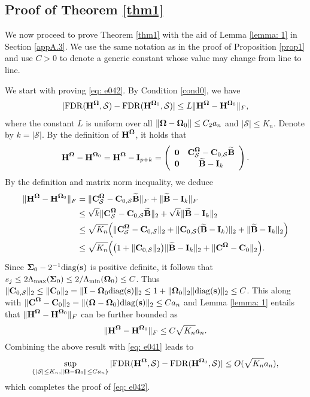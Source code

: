 \documentclass[11pt]{article}
\newcommand{\bs}{\mbox{\bf s}}
\newcommand{\bB}{\mbox{\bf B}}
\newcommand{\bC}{\mbox{\bf C}}
\newcommand{\bH}{\mbox{\bf H}}
\newcommand{\bI}{\mbox{\bf I}}
\newcommand{\bzero}{\mbox{\bf 0}}
\newcommand{\bSig}{\mbox{\boldmath $\Sigma$}}
\newcommand{\bOmg}{\mbox{\boldmath $\Omega$}}
\newcommand{\wt}{\widetilde}
\newcommand{\sbOmg}{\mbox{\scriptsize\boldmath $\Omega$}}
\newcommand{\Sig}{\mathbf{\Sigma}}
\newcommand{\diag}{\mathrm{diag}}
\begin{document}
\subsection{Proof of Theorem \ref{thm1}} \label{appA.4}

We now proceed to prove Theorem \ref{thm1} with the aid of Lemma \ref{lemma: 1} in Section \ref{appA.3}. We use the same notation  as in the proof of Proposition \ref{prop1} and use $C>0$ to denote a generic constant whose value may change from line to line.

We start with proving \eqref{eq: e042}. By Condition \ref{cond0}, we have
\begin{align}\label{eq: e041}
|{\rm FDR}(\bH^{\sbOmg}, \mathcal{S}) - {\rm FDR}(\bH^{\sbOmg_0}, \mathcal{S})| \leq L\|\bH^{\sbOmg} - \bH^{\sbOmg_0}\|_F,
\end{align}
where the constant $L$ is uniform over all $\|\bOmg - \bOmg_{0}\|\leq C_2a_n$ and $|\mathcal{S}|\leq K_n$.  Denote by $k = |\mathcal{S}|$. By the definition of $\bH^{\sbOmg}$, it holds that
\begin{align*}
\bH^{\sbOmg} - \bH^{\sbOmg_0} = \bH^{\sbOmg} - \bI_{p+k} = \left(\begin{array}{cc}
\bzero & \bC_{\mathcal S}^{\sbOmg}- \bC_{0,\mathcal{S}}\wt{\bB} \\
\bzero & \wt{\bB} -\bI_k
\end{array}\right).
\end{align*}
By the definition and matrix norm inequality, we deduce
\begin{align*}
\|\bH^{\sbOmg} - \bH^{\sbOmg_0} \|_F  & = \|\bC_{\mathcal S}^{\sbOmg}- \bC_{0,\mathcal{S}}\wt{\bB} \|_F + \|\wt{\bB} - \bI_k\|_F\\
&\leq  \sqrt{k}\|\bC_{\mathcal S}^{\sbOmg}- \bC_{0,\mathcal{S}}\wt{\bB} \|_2 + \sqrt{k} \|\wt{\bB} - \bI_k\|_2 \\
&\leq \sqrt{K_n}\Big(\|\bC_{\mathcal S}^{\sbOmg}- \bC_{0,\mathcal{S}}\|_2 + \|\bC_{0,\mathcal{S}}(\wt{\bB} -\bI_k) \|_2 + \|\wt{\bB} - \bI_k\|_2\Big)\\
& \leq \sqrt{K_n}\Big( \big(1+\|\bC_{0,\mathcal S}\|_2\big)\|\wt{\bB} - \bI_k\|_2 + \|\bC^{\sbOmg}- \bC_{0}\|_2\Big). %
\end{align*}
Since $\bSig_0 - 2^{-1}\diag(\bs)$ is positive definite, it follows that $s_j \leq 2\Lambda_{\max}(\Sig_0) \leq 2/\Lambda_{\min}(\bOmg_0)\leq C$. Thus  $\|\bC_{0,\mathcal S}\|_2 \leq \|\bC_{0}\|_2 = \|\bI - \bOmg_{0}\diag(\bs)\|_2 \leq 1 + \| \bOmg_{0}\|_2\|\diag(\bs)\|_2 \leq C$. This along with $\|\bC^{\sbOmg}- \bC_{0}\|_2 = \|(\bOmg-\bOmg_{0})\diag(\bs)\|_2\leq Ca_n$ and
Lemma \ref{lemma: 1} entails that $\|\bH^{\sbOmg} - \bH^{\sbOmg_0} \|_F$ can be further bounded as
\[
\|\bH^{\sbOmg} - \bH^{\sbOmg_0} \|_F \leq C\sqrt{K_n}a_n.
\]
Combining the above result with \eqref{eq: e041} leads to
\begin{align}
\sup_{\{|\mathcal{S}|\leq K_n, \|\sbOmg - \sbOmg_0\|\leq Ca_n\}}|{\rm FDR}(\bH^{\sbOmg}, \mathcal{S}) - {\rm FDR}(\bH^{\sbOmg_0}, \mathcal{S})| \leq O(\sqrt{K_n}a_n),
\end{align}
which completes the proof of \eqref{eq: e042}.
\end{document}
